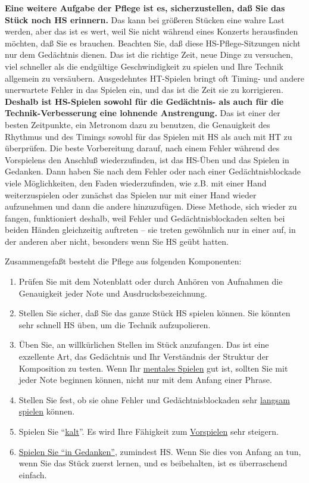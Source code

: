 \textbf{Eine weitere Aufgabe der Pflege ist es, sicherzustellen, daß Sie das Stück noch HS erinnern.}
Das kann bei größeren Stücken eine wahre Last werden, aber das ist es wert, weil Sie nicht während eines Konzerts herausfinden möchten, daß Sie es brauchen.
Beachten Sie, daß diese HS-Pflege-Sitzungen nicht nur dem Gedächtnis dienen.
Das ist die richtige Zeit, neue Dinge zu versuchen, viel schneller als die endgültige Geschwindigkeit zu spielen und Ihre Technik allgemein zu versäubern.
Ausgedehntes HT-Spielen bringt oft Timing- und andere unerwartete Fehler in das Spielen ein, und das ist die Zeit sie zu korrigieren.
\textbf{Deshalb ist HS-Spielen sowohl für die Gedächtnis- als auch für die Technik-Verbesserung eine lohnende Anstrengung.}
Das ist einer der besten Zeitpunkte, ein Metronom dazu zu benutzen, die Genauigkeit des Rhythmus und des Timings sowohl für das Spielen mit HS als auch mit HT zu überprüfen.
Die beste Vorbereitung darauf, nach einem Fehler während des Vorspielens den Anschluß wiederzufinden, ist das HS-Üben und das Spielen in Gedanken.
Dann haben Sie nach dem Fehler oder nach einer Gedächtnisblockade viele Möglichkeiten, den Faden wiederzufinden, wie z.B. mit einer Hand weiterzuspielen oder zunächst das Spielen nur mit einer Hand wieder aufzunehmen und dann die andere hinzuzufügen.
Diese Methode, sich wieder zu fangen, funktioniert deshalb, weil Fehler und Gedächtnisblockaden selten bei beiden Händen gleichzeitig auftreten -- sie treten gewöhnlich nur in einer auf, in der anderen aber nicht, besonders wenn Sie HS geübt hatten.

Zusammengefaßt besteht die Pflege aus folgenden Komponenten:

\begin{enumerate}[label={\arabic*.}] 
\item Prüfen Sie mit dem Notenblatt oder durch Anhören von Aufnahmen die Genauigkeit jeder Note und Ausdrucksbezeichnung.
\item Stellen Sie sicher, daß Sie das ganze Stück HS spielen können.
Sie könnten sehr schnell HS üben, um die Technik aufzupolieren.
\item Üben Sie, an willkürlichen Stellen im Stück anzufangen.
Das ist eine exzellente Art, das Gedächtnis und Ihr Verständnis der Struktur der Komposition zu testen.
Wenn Ihr \hyperref[c1iii6tastatur]{mentales Spielen} gut ist, sollten Sie mit jeder Note beginnen können, nicht nur mit dem Anfang einer Phrase.
\item Stellen Sie fest, ob sie ohne Fehler und Gedächtnisblockaden sehr \hyperref[c1iii6h]{langsam spielen} können.
\item Spielen Sie \enquote{\hyperref[c1iii6g]{kalt}}. Es wird Ihre Fähigkeit zum \hyperref[c1iii14]{Vorspielen} sehr steigern.
\item \hyperref[c1iii6tastatur]{Spielen Sie \enquote{in Gedanken}}, zumindest HS.
Wenn Sie dies von Anfang an tun, wenn Sie das Stück zuerst lernen, und es beibehalten, ist es überraschend einfach.
 \end{enumerate} 


